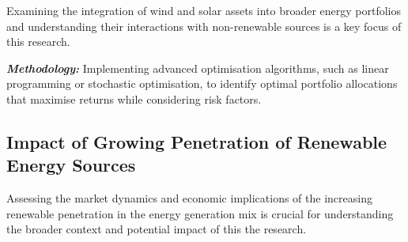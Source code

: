     Examining the integration of wind and solar assets into broader energy portfolios and understanding
    their interactions with non-renewable sources is a key focus of this research.

    \textbf{\textit{Methodology: }} Implementing advanced optimisation algorithms, such as linear programming or
    stochastic optimisation, to identify optimal portfolio allocations that maximise returns
    while considering risk factors.

\subsection{Impact of Growing Penetration of Renewable Energy Sources}
    \label{subsec:rs_impact-of-growing-penetration-of-renewable-energy-sources}

    Assessing the market dynamics and economic implications of the increasing renewable penetration in the
    energy generation mix is crucial for understanding the broader context and potential impact of this the research.

%
%

